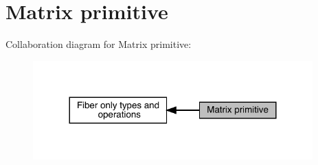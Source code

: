 \hypertarget{group__obsmatrix}{}\section{Matrix primitive}
\label{group__obsmatrix}
Collaboration diagram for Matrix primitive\+:\nopagebreak
\begin{figure}[H]
\begin{center}
\leavevmode
\includegraphics[width=305pt]{d8/d55/group__obsmatrix}
\end{center}
\end{figure}
